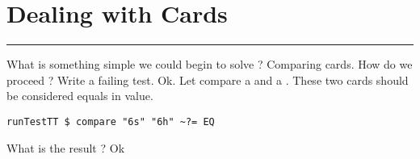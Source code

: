 \newpage
\section{Dealing with Cards} %
\vspace{10cm}
\hrule

\lhQ What is something simple we could begin to solve ?
\lhA Comparing cards.
\lhN How do we proceed ?
\lhA Write a failing test.
\lhN Ok. Let compare a  and a . These two cards should be considered equals in value.
\begin{lstlisting}[frame=single]
runTestTT $ compare "6s" "6h" ~?= EQ
\end{lstlisting} %
What is the result ?
\lhA Ok
\lhend